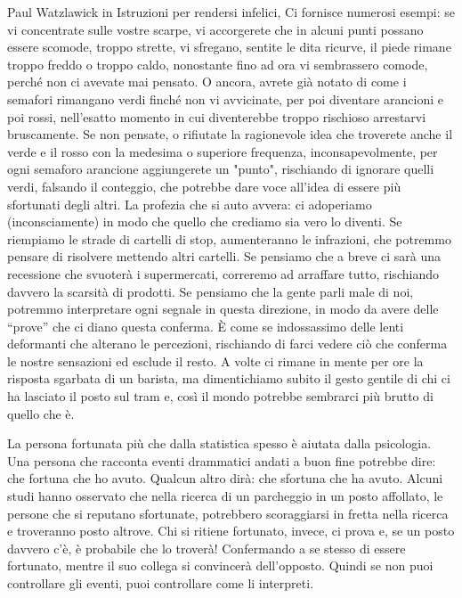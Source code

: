 \documentclass[12pt]{book} %
\begin{document}
Paul Watzlawick in Istruzioni per rendersi infelici, Ci fornisce
numerosi esempi: se vi concentrate sulle vostre scarpe, vi accorgerete che in alcuni punti possano essere scomode,
troppo strette, vi sfregano, sentite le dita ricurve, il piede rimane troppo freddo o troppo caldo, nonostante fino ad
ora vi sembrassero comode, perché non ci avevate mai pensato. O ancora, avrete già notato di come i semafori rimangano
verdi finché non vi avvicinate, per poi diventare arancioni e poi rossi, nell'esatto momento in
cui diventerebbe troppo rischioso arrestarvi bruscamente. Se non pensate, o rifiutate la ragionevole idea che troverete
anche il verde e il rosso con la medesima o superiore frequenza, inconsapevolmente, per ogni semaforo arancione
aggiungerete un "punto", rischiando di ignorare quelli verdi, falsando il conteggio, che potrebbe dare voce all'idea di essere più sfortunati degli
altri. La profezia che si auto avvera: ci adoperiamo (inconsciamente) in modo che quello che crediamo sia vero lo
diventi. Se riempiamo le strade di cartelli di stop, aumenteranno le infrazioni, che potremmo pensare di risolvere
mettendo altri cartelli. Se pensiamo che a breve ci sarà una recessione che svuoterà i supermercati, correremo ad
arraffare tutto, rischiando davvero la scarsità di prodotti. Se pensiamo che la gente parli male di noi, potremmo interpretare 
ogni segnale in questa direzione, in modo da avere delle “prove” che ci diano questa conferma. È come se indossassimo
delle lenti deformanti che alterano le percezioni, rischiando di farci vedere ciò che conferma le nostre sensazioni ed
esclude il resto. A volte ci rimane in mente per ore la risposta sgarbata di un
barista, ma dimentichiamo subito il gesto gentile di chi ci ha lasciato il posto sul tram e, così il mondo potrebbe sembrarci
più brutto di quello che è.

La persona fortunata più che dalla statistica spesso è aiutata dalla psicologia. Una persona che racconta eventi drammatici
andati a buon fine potrebbe dire: che fortuna che ho avuto. Qualcun altro dirà: che sfortuna che ha avuto. 
Alcuni studi hanno osservato che nella ricerca di un parcheggio in un posto affollato, le persone
che si reputano sfortunate, potrebbero scoraggiarsi in fretta nella ricerca e troveranno posto altrove. Chi si ritiene fortunato,
invece, ci prova e, se un posto davvero c'è, è probabile che lo troverà! Confermando a se stesso di essere fortunato, mentre il suo
collega si convincerà dell'opposto. Quindi se non puoi controllare gli eventi, puoi controllare
come li interpreti.
\end{document}
